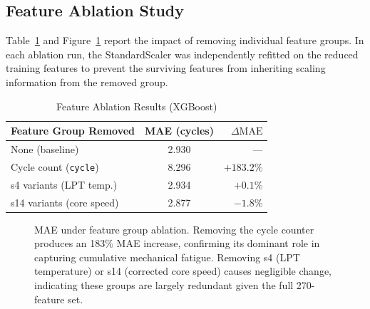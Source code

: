 \documentclass[10pt, journal, letterpaper]{IEEEtran}
\begin{document}
\subsection{Feature Ablation Study}

Table~\ref{tab:ablation} and Figure~\ref{fig:ablation} report the impact of
removing individual feature groups. In each ablation run, the StandardScaler
was independently refitted on the reduced training features to prevent the
surviving features from inheriting scaling information from the removed group.

\begin{table}[htbp]
\caption{Feature Ablation Results (XGBoost)}
\label{tab:ablation}
\centering\small
\begin{tabular}{lcr}
\toprule
\textbf{Feature Group Removed} & \textbf{MAE (cycles)} & $\Delta\mathrm{MAE}$ \\
\midrule
None (baseline)              & 2.930 & --- \\
Cycle count (\texttt{cycle}) & 8.296 & $+183.2\%$ \\
s4 variants (LPT temp.)      & 2.934 & $+0.1\%$   \\
s14 variants (core speed)    & 2.877 & $-1.8\%$   \\
\bottomrule
\end{tabular}
\end{table}

\begin{figure}[htbp]
\centering
{}
\caption{MAE under feature group ablation. Removing the cycle counter
produces an 183\% MAE increase, confirming its dominant role in capturing
cumulative mechanical fatigue. Removing s4 (LPT temperature) or s14
(corrected core speed) causes negligible change, indicating these groups
are largely redundant given the full 270-feature set.}
\label{fig:ablation}
\end{figure}
\end{document}
